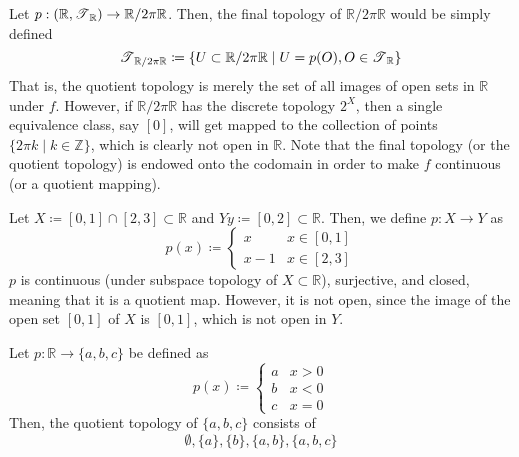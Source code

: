  \begin{example}
    Let $p: (\mathbb{R}, \operatorname{\mathscr{T}}_\mathbb{R}) \rightarrow \mathbb{R} / 2 \pi \mathbb{R}$. Then, the final topology of $\mathbb{R} / 2 \pi \mathbb{R}$ would be simply defined 
    \begin{equation}
      \operatorname{\mathscr{T}}_{\mathbb{R} / 2 \pi \mathbb{R}} \coloneqq \{U \subset \mathbb{R} / 2\pi \mathbb{R} \mid U = p(O), O \in \operatorname{\mathscr{T}}_\mathbb{R}\}
    \end{equation}
    That is, the quotient topology is merely the set of all images of open sets in $\mathbb{R}$ under $f$. However, if $\mathbb{R} / 2 \pi \mathbb{R}$ has the discrete topology $2^X$, then a single equivalence class, say $[0]$, will get mapped to the collection of points $\{2 \pi k \mid k \in \mathbb{Z}\}$, which is clearly not open in $\mathbb{R}$. Note that the final topology (or the quotient topology) is endowed onto the codomain in order to make $f$ continuous (or a quotient mapping). 
  \end{example}

  \begin{example}
    Let $X \coloneqq [0,1] \cap [2,3] \subset \mathbb{R}$ and $Y y \coloneqq [0,2] \subset \mathbb{R}$. Then, we define $p: X \rightarrow Y$ as 
    \begin{equation}
      p(x) \coloneqq \begin{cases} x & x \in [0,1] \\ x-1 & x \in [2,3] \end{cases}
    \end{equation}
    $p$ is continuous (under subspace topology of $X \subset \mathbb{R}$), surjective, and closed, meaning that it is a quotient map. However, it is not open, since the image of the open set $[0,1]$ of $X$ is $[0,1]$, which is not open in $Y$. 
  \end{example}

  \begin{example}
    Let $p: \mathbb{R} \rightarrow \{a, b, c\}$ be defined as 
    \begin{equation}
      p(x) \coloneqq \begin{cases} a & x > 0 \\ b & x < 0 \\ c & x = 0 \end{cases}
    \end{equation}
    Then, the quotient topology of $\{a, b, c\}$ consists of 
    \begin{equation}
      \emptyset, \{a\}, \{b\}, \{a, b\}, \{a, b, c\}
    \end{equation}
  \end{example}

